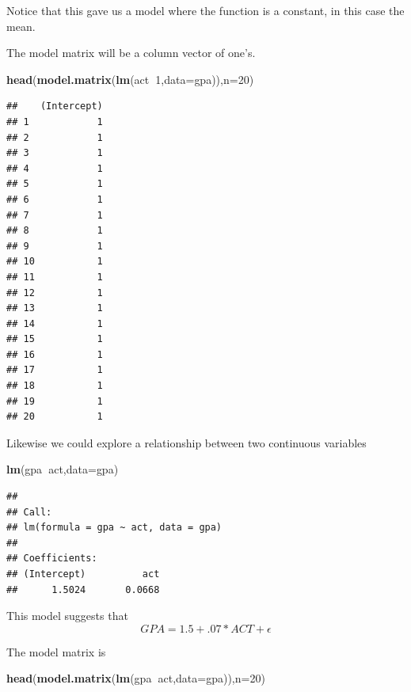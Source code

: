 \documentclass[]{book}
\newenvironment{Shaded}{\begin{snugshade}}{\end{snugshade}}
\newcommand{\KeywordTok}[1]{\textcolor[rgb]{0.13,0.29,0.53}{\textbf{#1}}}
\newcommand{\DataTypeTok}[1]{\textcolor[rgb]{0.13,0.29,0.53}{#1}}
\newcommand{\DecValTok}[1]{\textcolor[rgb]{0.00,0.00,0.81}{#1}}
\newcommand{\OperatorTok}[1]{\textcolor[rgb]{0.81,0.36,0.00}{\textbf{#1}}}
\newcommand{\NormalTok}[1]{#1}
\theoremstyle{definition}
\theoremstyle{definition}
\theoremstyle{definition}
\theoremstyle{remark}
\begin{document}
Notice that this gave us a model where the function is a constant, in
this case the mean.

The model matrix will be a column vector of one's.

\begin{Shaded}
\begin{Highlighting}[]
\KeywordTok{head}\NormalTok{(}\KeywordTok{model.matrix}\NormalTok{(}\KeywordTok{lm}\NormalTok{(act}\OperatorTok{~}\DecValTok{1}\NormalTok{,}\DataTypeTok{data=}\NormalTok{gpa)),}\DataTypeTok{n=}\DecValTok{20}\NormalTok{)}
\end{Highlighting}
\end{Shaded}

\begin{verbatim}
##    (Intercept)
## 1            1
## 2            1
## 3            1
## 4            1
## 5            1
## 6            1
## 7            1
## 8            1
## 9            1
## 10           1
## 11           1
## 12           1
## 13           1
## 14           1
## 15           1
## 16           1
## 17           1
## 18           1
## 19           1
## 20           1
\end{verbatim}

Likewise we could explore a relationship between two continuous
variables

\begin{Shaded}
\begin{Highlighting}[]
\KeywordTok{lm}\NormalTok{(gpa}\OperatorTok{~}\NormalTok{act,}\DataTypeTok{data=}\NormalTok{gpa)}
\end{Highlighting}
\end{Shaded}

\begin{verbatim}
## 
## Call:
## lm(formula = gpa ~ act, data = gpa)
## 
## Coefficients:
## (Intercept)          act  
##      1.5024       0.0668
\end{verbatim}

This model suggests that \[GPA=1.5+.07*ACT+\epsilon\]

The model matrix is

\begin{Shaded}
\begin{Highlighting}[]
\KeywordTok{head}\NormalTok{(}\KeywordTok{model.matrix}\NormalTok{(}\KeywordTok{lm}\NormalTok{(gpa}\OperatorTok{~}\NormalTok{act,}\DataTypeTok{data=}\NormalTok{gpa)),}\DataTypeTok{n=}\DecValTok{20}\NormalTok{)}
\end{Highlighting}
\end{Shaded}
\end{document}
